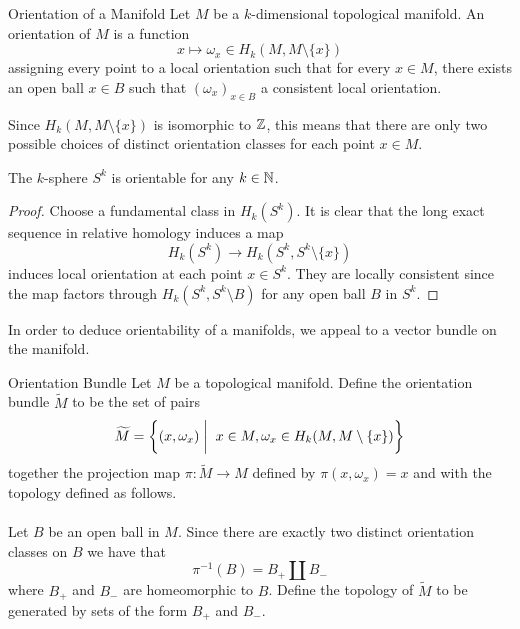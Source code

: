\documentclass[a4paper]{article}
\begin{document}
\begin{defn}{Orientation of a Manifold}{} Let $M$ be a $k$-dimensional topological manifold. An orientation of $M$ is a function $$x\mapsto\omega_x\in H_k(M,M\setminus\{x\})$$ assigning every point to a local orientation such that for every $x\in M$, there exists an open ball $x\in B$ such that $(\omega_x)_{x\in B}$ a consistent local orientation. 
\end{defn}

Since $H_k(M,M\setminus\{x\})$ is isomorphic to $\mathbb{Z}$, this means that there are only two possible choices of distinct orientation classes for each point $x\in M$. 

\begin{lmm}{}{} The $k$-sphere $S^k$ is orientable for any $k\in\mathbb{N}$. \tcbline
\begin{proof}
Choose a fundamental class in $H_k(S^k)$. It is clear that the long exact sequence in relative homology induces a map $$H_k(S^k)\to H_k(S^k,S^k\setminus\{x\})$$ induces local orientation at each point $x\in S^k$. They are locally consistent since the map factors through $H_k(S^k,S^k\setminus B)$ for any open ball $B$ in $S^k$. 
\end{proof}
\end{lmm}

In order to deduce orientability of a manifolds, we appeal to a vector bundle on the manifold. 

\begin{defn}{Orientation Bundle}{} Let $M$ be a topological manifold. Define the orientation bundle $\widetilde{M}$ to be the set of pairs $$\widetilde{M}=\left\{(x,\omega_x)\;\bigg{|}\;\; x\in M, \omega_x\in H_k(M,M\setminus\{x\})\right\}$$ together the projection map $\pi:\widetilde{M}\to M$ defined by $\pi(x,\omega_x)=x$ and with the topology defined as follows. \\~\\

Let $B$ be an open ball in $M$. Since there are exactly two distinct orientation classes on $B$ we have that $$\pi^{-1}(B)=B_+\amalg B_-$$ where $B_+$ and $B_-$ are homeomorphic to $B$. Define the topology of $\widetilde{M}$ to be generated by sets of the form $B_+$ and $B_-$. 
\end{defn}
\end{document}
